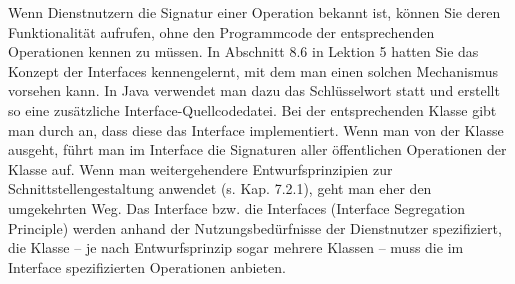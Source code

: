 Wenn Dienstnutzern die Signatur einer Operation bekannt ist, können Sie deren Funktionalität aufrufen, ohne den Programmcode der entsprechenden Opera\-tionen kennen zu müssen. In Abschnitt 8.6 in Lektion 5 hatten Sie das Konzept der 
\mbox{Interfaces} kennengelernt, mit dem man einen solchen Mechanismus vorsehen kann. In Java verwendet man dazu das Schlüsselwort  statt  und erstellt so eine zusätzliche Interface-Quellcodedatei. Bei der entsprechenden Klasse gibt man durch  an, dass diese das Interface implementiert. Wenn man von der Klasse ausgeht, führt man im Interface die Signaturen aller öffentlichen Operationen der Klasse auf. Wenn man weitergehendere Entwurfsprinzipien zur Schnittstellengestaltung anwendet (s. Kap. 7.2.1), geht man eher den umgekehrten Weg. Das Interface bzw. die Interfaces (Interface Segre\-ga\-tion Principle) werden anhand der Nutzungsbedürfnisse der Dienstnutzer spezifiziert, die Klasse -- je nach Entwurfsprinzip sogar mehrere Klassen -- muss die im Interface spezifizierten Operationen anbieten.
